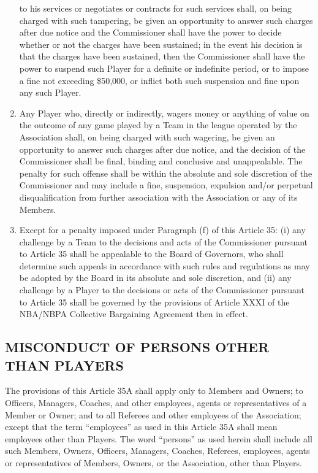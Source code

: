 \documentclass[]{book}
\theoremstyle{definition}
\theoremstyle{definition}
\theoremstyle{definition}
\theoremstyle{remark}
\begin{document}
\begin{enumerate}
  to his services or negotiates or contracts for such services shall, on
  being charged with such tampering, be given an opportunity to answer
  such charges after due notice and the Commissioner shall have the
  power to decide whether or not the charges have been sustained; in the
  event his decision is that the charges have been sustained, then the
  Commissioner shall have the power to suspend such Player for a
  definite or indefinite period, or to impose a fine not exceeding
  \$50,000, or inflict both such suspension and fine upon any such
  Player.
\item
  Any Player who, directly or indirectly, wagers money or anything of
  value on the outcome of any game played by a Team in the league
  operated by the Association shall, on being charged with such
  wagering, be given an opportunity to answer such charges after due
  notice, and the decision of the Commissioner shall be final, binding
  and conclusive and unappealable. The penalty for such offense shall be
  within the absolute and sole discretion of the Commissioner and may
  include a fine, suspension, expulsion and/or perpetual
  disqualification from further association with the Association or any
  of its Members.
\item
  Except for a penalty imposed under Paragraph (f) of this Article 35:
  (i) any challenge by a Team to the decisions and acts of the
  Commissioner pursuant to Article 35 shall be appealable to the Board
  of Governors, who shall determine such appeals in accordance with such
  rules and regulations as may be adopted by the Board in its absolute
  and sole discretion, and (ii) any challenge by a Player to the
  decisions or acts of the Commissioner pursuant to Article 35 shall be
  governed by the provisions of Article XXXI of the NBA/NBPA Collective
  Bargaining Agreement then in effect.
\end{enumerate}

\subsection{MISCONDUCT OF PERSONS OTHER THAN
PLAYERS}\label{misconduct-of-persons-other-than-players}

The provisions of this Article 35A shall apply only to Members and
Owners; to Officers, Managers, Coaches, and other employees, agents or
representatives of a Member or Owner; and to all Referees and other
employees of the Association; except that the term ``employees'' as used
in this Article 35A shall mean employees other than Players. The word
``persons'' as used herein shall include all such Members, Owners,
Officers, Managers, Coaches, Referees, employees, agents or
representatives of Members, Owners, or the Association, other than
Players.
\end{document}
